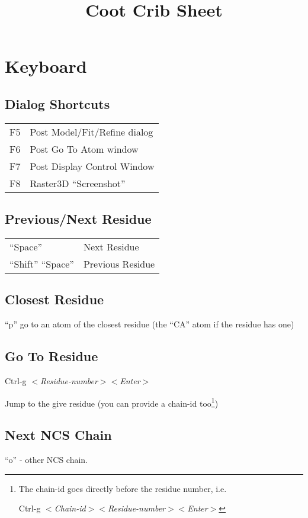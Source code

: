 \documentclass[twocolumn]{article}
\title{Coot Crib Sheet}
\begin{document}
\maketitle

\section{Keyboard}

\subsection{Dialog Shortcuts}
\begin{tabular}{ll}
  F5  & Post Model/Fit/Refine dialog \\
  F6  & Post Go To Atom window \\
  F7  & Post Display Control Window\\
  F8 & Raster3D ``Screenshot''
\end{tabular}


\subsection{Previous/Next Residue}

\begin{tabular}{ll}
  ``Space'' & Next Residue \\
  ``Shift'' ``Space'' & Previous Residue
\end{tabular}

\subsection{Closest Residue}
``p'' go to an atom of the closest residue (the ``CA'' atom if the
residue has one)

\subsection{Go To Residue}
Ctrl-g $<$\emph{Residue-number}$>$$<$\emph{Enter}$>$

Jump to the give residue (you can provide a chain-id too\footnote
{The chain-id goes directly before the residue number, i.e.
 
Ctrl-g $<$\emph{Chain-id}$>$$<$\emph{Residue-number}$>$$<$\emph{Enter}$>$})

\subsection{Next NCS Chain}
``o'' - other NCS chain.
\end{document}
